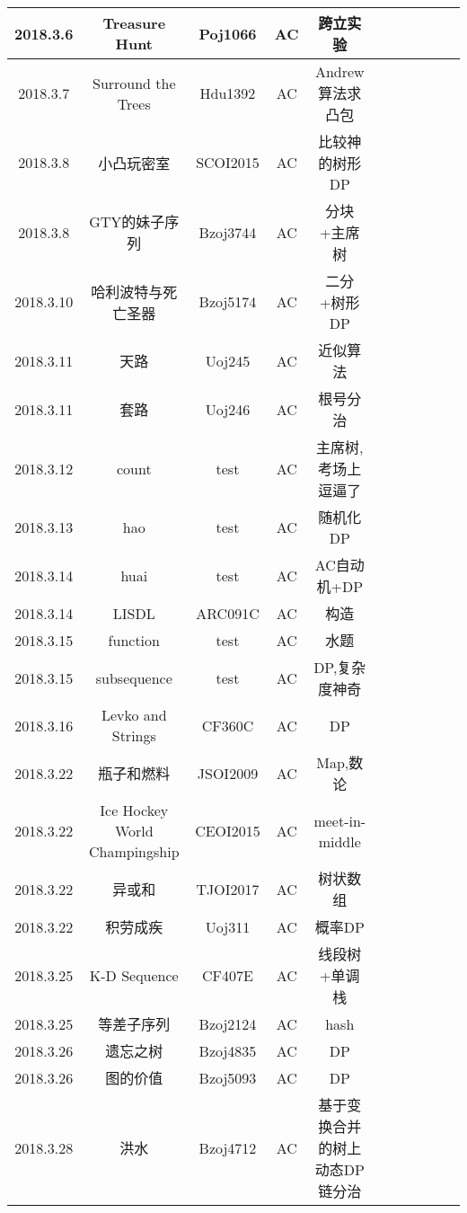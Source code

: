 \documentclass[landscape]{article}
\begin{document}
\begin{longtable}{ccccccccccc}
  \hline
  2018.3.6 & Treasure Hunt & Poj1066 & AC & 跨立实验\\
  \hline
  2018.3.7 & Surround the Trees & Hdu1392 & AC & Andrew算法求凸包\\
  \hline
  2018.3.8 & 小凸玩密室 & SCOI2015 & AC & 比较神的树形DP\\
  \hline
  2018.3.8 & GTY的妹子序列 & Bzoj3744 & AC & 分块+主席树\\
  \hline
  2018.3.10 & 哈利波特与死亡圣器 & Bzoj5174 & AC & 二分+树形DP\\
  \hline
  2018.3.11 & 天路 & Uoj245 & AC & 近似算法\\
  \hline
  2018.3.11 & 套路 & Uoj246 & AC & 根号分治\\
  \hline
  2018.3.12 & count & test & AC & 主席树,考场上逗逼了\\
  \hline
  2018.3.13 & hao & test & AC & 随机化DP\\
  \hline
  2018.3.14 & huai & test & AC & AC自动机+DP\\
  \hline
  2018.3.14 & LISDL & ARC091C & AC & 构造\\
  \hline
  2018.3.15 & function & test & AC & 水题\\
  \hline
  2018.3.15 & subsequence & test & AC & DP,复杂度神奇\\
  \hline
  2018.3.16 & Levko and Strings & CF360C & AC & DP\\
  \hline
  2018.3.22 & 瓶子和燃料 & JSOI2009 & AC & Map,数论\\
  \hline
  2018.3.22 & Ice Hockey World Champingship & CEOI2015 & AC & meet-in-middle\\
  \hline
  2018.3.22 & 异或和 & TJOI2017 & AC & 树状数组\\
  \hline
  2018.3.22 & 积劳成疾 & Uoj311 & AC & 概率DP\\
  \hline
  2018.3.25 & K-D Sequence & CF407E & AC & 线段树+单调栈\\
  \hline
  2018.3.25 & 等差子序列 & Bzoj2124 & AC & hash\\
  \hline
  2018.3.26 & 遗忘之树 & Bzoj4835 & AC & DP\\
  \hline
  2018.3.26 & 图的价值 & Bzoj5093 & AC & DP\\
  \hline
  2018.3.28 & 洪水 & Bzoj4712 & AC & 基于变换合并的树上动态DP链分治\\
  \hline
  
\end{longtable}
\end{document}
